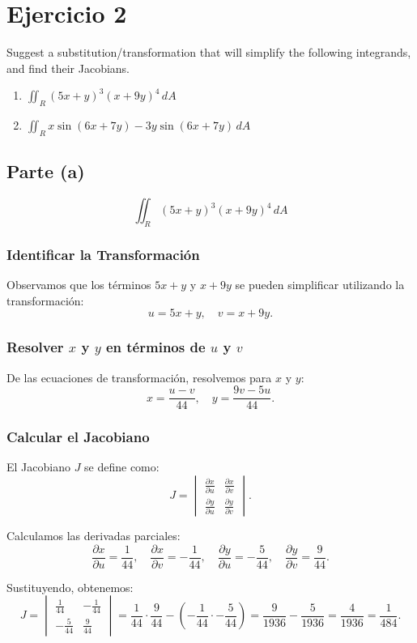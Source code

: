 \section{Ejercicio 2}
    Suggest a substitution/transformation that will simplify the following integrands, and find their Jacobians.
    \begin{enumerate}
        \item $\iint_R (5x + y)^3 (x + 9y)^4 \, dA$
        \item $\iint_R x \sin(6x + 7y) - 3y \sin(6x + 7y) \, dA$
    \end{enumerate}

    \subsection*{Parte (a)}
\[
\iint_R (5x + y)^3 (x + 9y)^4 \, dA
\]

\subsubsection*{Identificar la Transformación}
Observamos que los términos \(5x + y\) y \(x + 9y\) se pueden simplificar utilizando la transformación:
\[
u = 5x + y, \quad v = x + 9y.
\]

\subsubsection*{Resolver \(x\) y \(y\) en términos de \(u\) y \(v\)}
De las ecuaciones de transformación, resolvemos para \(x\) y \(y\):
\[
x = \frac{u - v}{44}, \quad y = \frac{9v - 5u}{44}.
\]

\subsubsection*{Calcular el Jacobiano}
El Jacobiano \(J\) se define como:
\[
J = \begin{vmatrix}
\frac{\partial x}{\partial u} & \frac{\partial x}{\partial v} \\
\frac{\partial y}{\partial u} & \frac{\partial y}{\partial v}
\end{vmatrix}.
\]

Calculamos las derivadas parciales:
\[
\frac{\partial x}{\partial u} = \frac{1}{44}, \quad \frac{\partial x}{\partial v} = -\frac{1}{44}, \quad \frac{\partial y}{\partial u} = -\frac{5}{44}, \quad \frac{\partial y}{\partial v} = \frac{9}{44}.
\]

Sustituyendo, obtenemos:
\[
J = \begin{vmatrix}
\frac{1}{44} & -\frac{1}{44} \\
-\frac{5}{44} & \frac{9}{44}
\end{vmatrix} = \frac{1}{44} \cdot \frac{9}{44} - \left(-\frac{1}{44} \cdot -\frac{5}{44}\right) = \frac{9}{1936} - \frac{5}{1936} = \frac{4}{1936} = \frac{1}{484}.
\]


